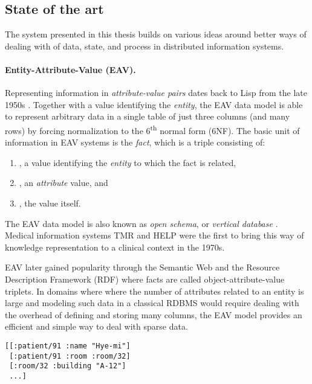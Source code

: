 \subsection{State of the art}\label{sec:sota}

The system presented in this thesis builds on various ideas around better ways of dealing with of data, state, and process in distributed information systems.

\paragraph{Entity-Attribute-Value (EAV).}

Representing information in \emph{attribute-value pairs} dates back to Lisp from the late 1950s \cite{mccarthy1960recursive}. Together with a value identifying the \emph{entity}, the EAV data model is able to represent arbitrary data in a single table of just three columns (and many rows) by forcing normalization to the 6\textsuperscript{th} normal form (6NF). The basic unit of information in EAV systems is the \emph{fact}, which is a triple \lisp{[e a v]} consisting of:

\begin{enumerate}[nolistsep,label={(\roman*)}]
  \item {}, a value identifying the \emph{entity} to which the fact is related,
  \item {}, an \emph{attribute} value, and
  \item {}, the value itself.
\end{enumerate}

The EAV data model is also known as \emph{open schema}, or \emph{vertical database} \cite{jastrow2015entity}. Medical information systems TMR \cite{stead1983chartless} and HELP \cite{huff1994help} were the first to bring this way of knowledge representation to a clinical context in the 1970s.

EAV later gained popularity through the Semantic Web and the Resource Description Framework (RDF) \cite{decker2000semantic} where facts are called object-attribute-value triplets. In domains where where the number of attributes related to an entity is large and modeling such data in a classical \gls{RDBMS} would require dealing with the overhead of defining and storing many columns, the EAV model provides an efficient and simple way to deal with sparse data.

\begin{lstlisting}[label={lst:examplefacts},morekeywords={patient,name,room,building},caption=A sequence of EAV facts]
[[:patient/91 :name "Hye-mi"]
 [:patient/91 :room :room/32]
 [:room/32 :building "A-12"]
 ...]
\end{lstlisting}

